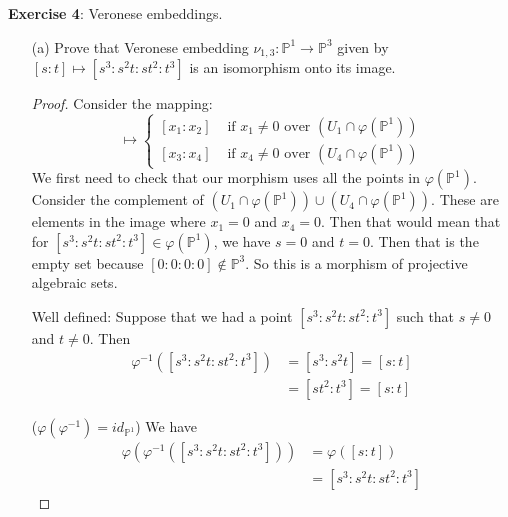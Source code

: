 \documentclass{article}
\begin{document}
\textbf{Exercise 4}: Veronese embeddings.
    \begin{itemize}
        \item [(a)] Prove that Veronese embedding $\nu_{1, 3} : \mathbb{P}^{1} \rightarrow \mathbb{P}^{3}$ given by $[s : t] \mapsto [s^{3} : s^{2}t : st^{2} : t^{3}]$ is an isomorphism onto its image.
            \begin{proof}
                Consider the mapping:
                    \begin{equation*}
                        [x_{1} : x_{2} : x_{3} : x_{4}] \mapsto \begin{cases}
                            [x_{1} : x_{2}] &\text{ if } x_{1} \neq 0 \text{ over } (U_{1} \cap \varphi (\mathbb{P}^{1}))\\
                            [x_{3} : x_{4}] &\text{ if } x_{4} \neq 0 \text{ over } (U_{4} \cap \varphi (\mathbb{P}^{1}))
                        \end{cases}
                    \end{equation*}
                We first need to check that our morphism uses all the points in $\varphi (\mathbb{P}^{1})$. Consider the complement of $(U_{1} \cap \varphi(\mathbb{P}^{1})) \cup (U_{4} \cap \varphi (\mathbb{P}^{1}))$. These are elements in the image where $x_{1} =  0$ and $x_{4} = 0$. Then that would mean that for $[s^{3} : s^{2}t : st^{2} : t^{3}] \in \varphi (\mathbb{P}^{1})$, we have $s = 0$ and $t = 0$. Then that is the empty set because $[0 : 0 : 0 : 0] \notin \mathbb{P}^{3}$. So this is a morphism of projective algebraic sets.

                Well defined: Suppose that we had a point $[s^{3} : s^{2}t : st^{2} : t^{3}]$ such that $s \neq 0$ and $t \neq 0$. Then
                    \begin{align*}
                        \varphi^{-1}([s^{3} : s^{2}t : st^{2} : t^{3}]) &= [s^{3} : s^{2}t] = [s : t]  \\
                                                                        &= [st^{2} : t^{3}] = [s : t]
                    \end{align*}

                ($\varphi (\varphi^{-1}) = id_{\mathbb{P}^{1}}$) We have
                    \begin{align*}
                        \varphi (\varphi^{-1}([s^{3} : s^{2}t : st^{2} : t^{3}])) &= \varphi ([s : t])                 \\
                                                                                  &= [s^{3} : s^{2}t : st^{2} : t^{3}]   
                    \end{align*}


\end{proof}
\end{itemize}
\end{document}
